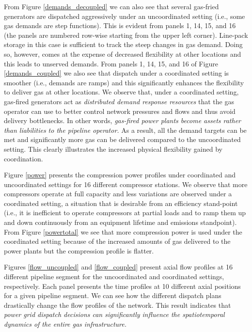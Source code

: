 \documentclass[11pt,twoside]{article}
\begin{document}
From  Figure \ref{demands_decoupled}  we can also see that several gas-fried generators are dispatched  aggressively under an uncoordinated setting (i.e., some gas demands are step functions). This is evident from panels 1, 14, 15, and 16 (the panels are numbered row-wise starting from the upper left corner). Line-pack storage in this case is sufficient to track the steep changes in gas demand. Doing so, however, comes at the expense of decreased flexibility at other locations and this leads to unserved demands.  From panels 1, 14, 15, and 16 of Figure \ref{demands_coupled} we also see that dispatch under a coordinated setting is smoother (i.e., demands are ramps) and this significantly enhances the flexibility to deliver gas at other locations. We observe that, under a coordinated setting, gas-fired generators act as {\em distributed demand response resources}  that the gas operator can use to better control network pressures and flows and thus avoid delivery bottlenecks. In other words, {\em gas-fired power plants become assets rather than liabilities to the pipeline operator.} As a result, all the demand targets can be met and significantly more gas can be delivered compared to the uncoordinated setting. This clearly illustrates the increased physical flexibility gained by coordination.  

Figure \ref{power} presents the compression power profiles under coordinated and uncoordinated settings for 16 different compressor stations. We observe that more compressors operate at full capacity and less variations are observed under a coordinated setting, a situation that is desirable from an efficiency stand-point (i.e., it is inefficient to operate compressors at partial loads and to ramp them up and down continuously from an equipment lifetime and emissions standpoint). From Figure \ref{powertotal} we see that more compression power is used under the coordinated setting because of the increased amounts of gas delivered to the power plants but the compression profile is flatter. 

Figures  \ref{flow_uncoupled}  and \ref{flow_coupled} present axial flow profiles at 16 different pipeline segment for the uncoordinated and coordinated settings, respectively.  Each panel presents the time profiles at 10 different axial positions for a given pipeline segment.  We can see how the different dispatch plans drastically change the flow profiles of the network.  This result indicates that {\em power grid dispatch decisions can significantly influence the spatiotemporal dynamics of the entire gas infrastructure.} 
\end{document}
